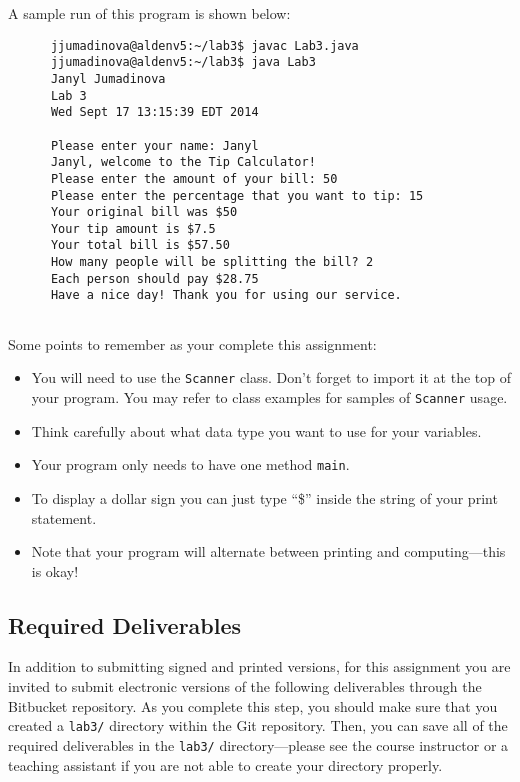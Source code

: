 A sample run of this program is shown below:
\begin{verbatim}
      jjumadinova@aldenv5:~/lab3$ javac Lab3.java
      jjumadinova@aldenv5:~/lab3$ java Lab3
      Janyl Jumadinova
      Lab 3
      Wed Sept 17 13:15:39 EDT 2014
      
      Please enter your name: Janyl
      Janyl, welcome to the Tip Calculator!
      Please enter the amount of your bill: 50
      Please enter the percentage that you want to tip: 15
      Your original bill was $50
      Your tip amount is $7.5
      Your total bill is $57.50
      How many people will be splitting the bill? 2
      Each person should pay $28.75
      Have a nice day! Thank you for using our service.
   
\end{verbatim}
\vspace{-0.2in}
Some points to remember as your complete this assignment:
\begin{itemize}
\item You will need to use the {\tt Scanner} class. Don't forget to import it at the top of your program. You may refer to
  class examples for samples of {\tt Scanner} usage. 
\item Think carefully about what data type you want to use for your variables.
\item Your program only needs to have one method {\tt main}.
\item To display a dollar sign you can just type ``\$'' inside the string of your print statement. 
\item Note that your program will alternate between printing and computing---this 
is okay!
\end{itemize}

\vspace{-0.2in}
\subsection*{Required Deliverables}

In addition to submitting signed and printed versions, for this assignment you are invited to submit electronic versions
of the following deliverables through the Bitbucket repository. As you complete this step, you should make sure that you
created a {\tt lab3/} directory within the Git repository.  Then, you can save all of the required deliverables in the
{\tt lab3/} directory---please see the course instructor or a teaching assistant if you are not able to create your
directory properly. 

